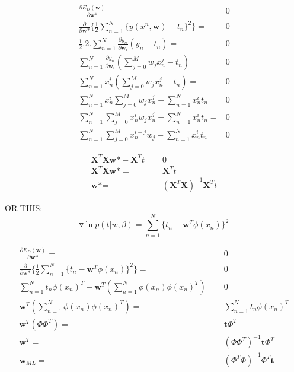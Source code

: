 \documentclass[12pt,twoside,a4paper]{article}
\begin{document}
\begin{align}
\frac{\partial E_D(\textbf{w})}{\partial \textbf{w*}} =& 0\\
\frac{\partial}{\partial \textbf{w*}} \{\frac{1}{2}\sum_{n=1}^{N}\{y(x^n, \textbf{w})-t_n\}^2\} =& 0 \\
\frac{1}{2}.2.\sum_{n=1}^{N}\frac{\partial y_n}{\partial \textbf{w}_i}(y_n-t_n) =& 0 \\
\sum_{n=1}^{N}\frac{\partial y_n}{\partial \textbf{w}_i}(\sum_{j=0}^{M}{w_jx^j_n}-t_n) =& 0 \\
\sum_{n=1}^{N}x_n^i(\sum_{j=0}^{M}{w_jx^j_n}-t_n) =& 0 \\
\sum_{n=1}^{N}x_n^i\sum_{j=0}^{M}{w_jx^j_n} - \sum_{n=1}^{N}x_n^it_n =& 0 \\
\sum_{n=1}^{N}\sum_{j=0}^{M}{x_n^iw_jx^j_n} - \sum_{n=1}^{N}x_n^it_n =& 0 \\
\sum_{n=1}^{N}\sum_{j=0}^{M}{x^{i+j}_nw_j} - \sum_{n=1}^{N}x_n^it_n =& 0 \label{MLDERSUM}
\end{align}

\begin{align}
\textbf{X}^T\textbf{X}\textbf{w*} - \textbf{X}^Tt =& 0 \\
\textbf{X}^T\textbf{X}\textbf{w*} =& \textbf{X}^Tt \\
\textbf{w*} =& (\textbf{X}^T\textbf{X})^{-1}\textbf{X}^Tt \label{WMLFINAL}
\end{align}

 OR THIS:
 \begin{equation}
     \triangledown\ln p(t|w,\beta) = \sum_{n=1}^{N}\{t_n - \textbf{w}^T\phi(x_n)\}^2
 \end{equation}

\begin{align}
\frac{\partial E_D(\textbf{w})}{\partial \textbf{w*}} =& 0\\
\frac{\partial}{\partial \textbf{w*}} \{ \frac{1}{2}\sum_{n=1}^{N}\{t_n - \textbf{w}^T\phi(x_n)\}^2 \} =& 0 \\
\sum_{n=1}^{N}t_n\phi(x_n)^T - \textbf{w}^T\left(\sum_{n=1}^{N}{\phi(x_n)\phi(x_n)^T} \right) =& 0 \\
\textbf{w}^T\left(\sum_{n=1}^{N}{\phi(x_n)\phi(x_n)^T} \right) =& \sum_{n=1}^{N}t_n\phi(x_n)^T \\
\textbf{w}^T(\Phi\Phi^T) =&\textbf{t}\Phi^T \\
\textbf{w}^T =& (\Phi\Phi^T)^{-1}\textbf{t}\Phi^T \\
\textbf{w}_{ML} =& (\Phi^T\Phi)^{-1}\Phi^T\textbf{t} \label{WML}
\end{align}
\end{document}

